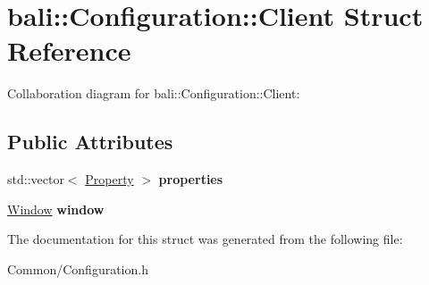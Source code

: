 \hypertarget{structbali_1_1_configuration_1_1_client}{\section{bali\-:\-:Configuration\-:\-:Client Struct Reference}
\label{structbali_1_1_configuration_1_1_client}
}


Collaboration diagram for bali\-:\-:Configuration\-:\-:Client\-:
\subsection*{Public Attributes}
\begin{DoxyCompactItemize}
\item 
\hypertarget{structbali_1_1_configuration_1_1_client_ac678b8e8b699497f7c1cb106afc1a990}{std\-::vector$<$ \hyperlink{structbali_1_1_configuration_1_1_property}{Property} $>$ {\bfseries properties}}\label{structbali_1_1_configuration_1_1_client_ac678b8e8b699497f7c1cb106afc1a990}

\item 
\hypertarget{structbali_1_1_configuration_1_1_client_afe004284256dd29458c960dd4073d738}{\hyperlink{structbali_1_1_configuration_1_1_window}{Window} {\bfseries window}}\label{structbali_1_1_configuration_1_1_client_afe004284256dd29458c960dd4073d738}

\end{DoxyCompactItemize}


The documentation for this struct was generated from the following file\-:\begin{DoxyCompactItemize}
\item 
Common/Configuration.\-h\end{DoxyCompactItemize}
